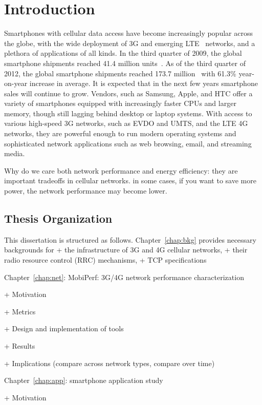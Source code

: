 \chapter{Introduction}   \label{chap:intro}

Smartphones with cellular data access have become increasingly popular across the globe, with the wide deployment of 3G and emerging LTE~\cite{3gpp.lte} networks, and a plethora of applications of all kinds. In the third quarter of 2009, the global smartphone shipments reached 41.4 million units~\cite{smartphoneStat}. As of the third quarter of 2012, the global smartphone shipments reached 173.7 million~\cite{smartphoneStat2} with 61.3\% year-on-year increase in average. It is expected that in the next few years smartphone sales will continue to grow.  Vendors, such as Samsung, Apple, and HTC offer a variety of smartphones equipped with increasingly faster CPUs and larger memory, though still lagging behind desktop or laptop systems. With access to various high-speed 3G networks, such as EVDO and UMTS, and the LTE 4G networks, they are powerful enough to run modern operating systems and sophisticated network applications such as web browsing, email, and streaming media. 

Why do we care both network performance and energy efficiency: they are important tradeoffs in cellular networks. in some cases, if you want to save more power, the network performance may become lower.

\section{Thesis Organization}

This dissertation is structured as follows. Chapter~\ref{chap:bkg} provides necessary backgrounds for 
+ the infrastructure of 3G and 4G cellular networks, 
+ their radio resource control (RRC) mechanisms, 
+ TCP specifications

Chapter~\ref{chap:net}: MobiPerf: 3G/4G network performance characterization

	+ Motivation

	+ Metrics

	+ Design and implementation of tools

	+ Results

	+ Implications (compare across network types, compare over time)
	
	
Chapter~\ref{chap:app}: smartphone application study

	+ Motivation

